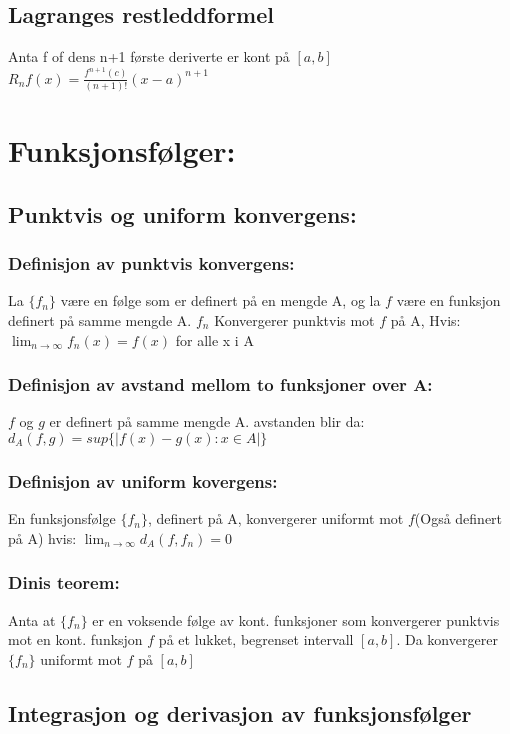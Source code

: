 \documentclass[8pt,a4paper,twocolumn,twoside]{article}
\def\abs#1{\lvert #1 \rvert}
\begin{document}
        \subsection*{Lagranges restleddformel}
        Anta f of dens n+1 første deriverte er kont på $[a,b]$\\
        $R_nf(x) = \frac{f^{n+1}(c)}{(n+1)!}(x-a)^{n+1}$
    \section*{Funksjonsfølger:}
        \subsection*{Punktvis og uniform konvergens:}
            \subsubsection*{Definisjon av punktvis konvergens:}
            La $\{f_n\}$ være en følge som er definert på en mengde A, og la $f$ være en funksjon definert på 
            samme mengde A. ${f_n}$ Konvergerer punktvis mot $f$ på A, Hvis:
            $\lim_{n\to\infty}f_n(x)=f(x)$ for alle x i A
            \subsubsection*{Definisjon av avstand mellom to funksjoner over A:}
            $f$ og $g$ er definert på samme mengde A. avstanden blir da:
            $d_A(f,g) = sup\{\abs{f(x)-g(x):x\in A}\}$
            \subsubsection*{Definisjon av uniform kovergens:}
            En funksjonsfølge $\{f_n\}$, definert på A, konvergerer uniformt mot $f$(Også definert på A) hvis:
            $\lim_{n\to\infty}d_A(f,f_n) = 0$
            \subsubsection*{Dinis teorem:}
            Anta at $\{f_n\}$ er en voksende følge av kont. funksjoner som konvergerer punktvis mot en kont.
            funksjon $f$ på et lukket, begrenset intervall $[a,b]$. Da konvergerer $\{f_n\}$ uniformt mot $f$ på $[a,b]$
        \subsection*{Integrasjon og derivasjon av funksjonsfølger}
\end{document}
